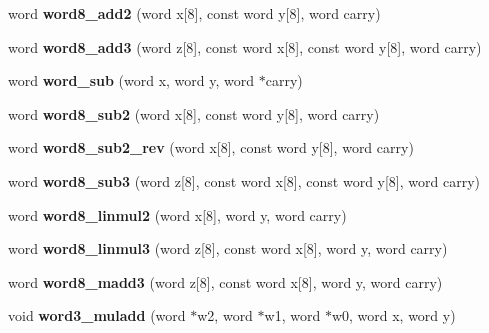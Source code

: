 \begin{DoxyCompactItemize}
word {\bfseries word8\+\_\+add2} (word x\mbox{[}8\mbox{]}, const word y\mbox{[}8\mbox{]}, word carry)
\item 
\mbox{\label{namespace_botan_a82aa291d5f3438ec4c380a86eb8893a6}} 
word {\bfseries word8\+\_\+add3} (word z\mbox{[}8\mbox{]}, const word x\mbox{[}8\mbox{]}, const word y\mbox{[}8\mbox{]}, word carry)
\item 
\mbox{\label{namespace_botan_a111b44a20862b5c882c6e916c5b74126}} 
word {\bfseries word\+\_\+sub} (word x, word y, word $\ast$carry)
\item 
\mbox{\label{namespace_botan_a2438179f85074db546171eeddcff9bef}} 
word {\bfseries word8\+\_\+sub2} (word x\mbox{[}8\mbox{]}, const word y\mbox{[}8\mbox{]}, word carry)
\item 
\mbox{\label{namespace_botan_ac91e1138f9d281c77c89f1ecc892e717}} 
word {\bfseries word8\+\_\+sub2\+\_\+rev} (word x\mbox{[}8\mbox{]}, const word y\mbox{[}8\mbox{]}, word carry)
\item 
\mbox{\label{namespace_botan_a04d94b0082a82368807a32080797a845}} 
word {\bfseries word8\+\_\+sub3} (word z\mbox{[}8\mbox{]}, const word x\mbox{[}8\mbox{]}, const word y\mbox{[}8\mbox{]}, word carry)
\item 
\mbox{\label{namespace_botan_a6c98a507837662f72fde19b95fe17410}} 
word {\bfseries word8\+\_\+linmul2} (word x\mbox{[}8\mbox{]}, word y, word carry)
\item 
\mbox{\label{namespace_botan_a5b52521e8eb536fa0c5818344a143f86}} 
word {\bfseries word8\+\_\+linmul3} (word z\mbox{[}8\mbox{]}, const word x\mbox{[}8\mbox{]}, word y, word carry)
\item 
\mbox{\label{namespace_botan_a05970f4cd10cae2e0d0404fec0a0422f}} 
word {\bfseries word8\+\_\+madd3} (word z\mbox{[}8\mbox{]}, const word x\mbox{[}8\mbox{]}, word y, word carry)
\item 
\mbox{\label{namespace_botan_a811a309dd3ad51a5f63f9100337ad144}} 
void {\bfseries word3\+\_\+muladd} (word $\ast$w2, word $\ast$w1, word $\ast$w0, word x, word y)

\end{DoxyCompactItemize}
